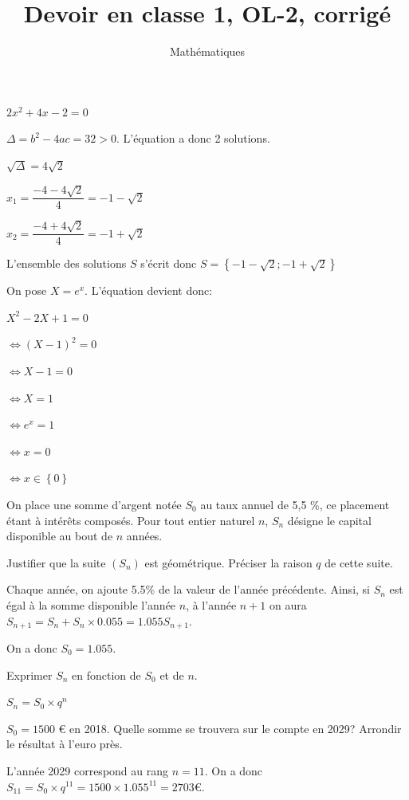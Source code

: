 \documentclass[a4paper,12pt]{scrartcl}
\date{}
\title{Devoir en classe 1, OL-2, corrigé}
\author{Mathématiques}
\begin{document}
\maketitle


\question{}
$2x^2 +4x - 2 = 0$

$\Delta = b^2 - 4ac = 32 > 0$. L'équation a donc 2 solutions.

$\sqrt{\Delta} = 4 \sqrt{2}$

$x_1 = \dfrac{-4-4\sqrt{2}}{4} = -1-\sqrt{2}$

$x_2 = \dfrac{-4+4\sqrt{2}}{4} = -1+\sqrt{2}$

L'ensemble des solutions $S$ s'écrit donc $S = \left\lbrace -1-\sqrt{2};-1+\sqrt{2} \right\rbrace$

\question{}
On pose $X = e^x$. L'équation devient donc:

$X^2 - 2X + 1 = 0$

$\Leftrightarrow (X - 1)^2 = 0$

$\Leftrightarrow X - 1 = 0$

$\Leftrightarrow X = 1$

$\Leftrightarrow e^x = 1$

$\Leftrightarrow x = 0$

$\Leftrightarrow x \in \left\lbrace 0 \right\rbrace$



On place une somme d'argent notée $S_0$ au taux annuel de 5,5 \%, ce placement étant à intérêts composés.
Pour tout entier naturel $n$, $S_n$ désigne le capital disponible au bout de $n$ années.

\question{}
Justifier que la suite $(S_n)$ est géométrique. Préciser la raison $q$ de cette suite.

Chaque année, on ajoute 5.5\% de la valeur de l'année précédente. Ainsi, si $S_n$ est égal à la somme disponible l'année $n$, à l'année $n+1$ on aura $S_{n+1} = S_n + S_n \times 0.055 = 1.055 S_{n+1}$. 

On a donc $S_0 = 1.055$.

\question{}
Exprimer $S_n$ en fonction de $S_0$ et de $n$.

$S_n = S_0 \times q^n$

\question{}
$S_0 = 1500$ € en 2018. Quelle somme se trouvera sur le compte en 2029? Arrondir le résultat à l'euro près. 

L'année 2029 correspond au rang $n=11$. On a donc $S_{11} = S_0 \times q^{11} = 1500 \times 1.055^{11} = 2703$€.
\end{document}
